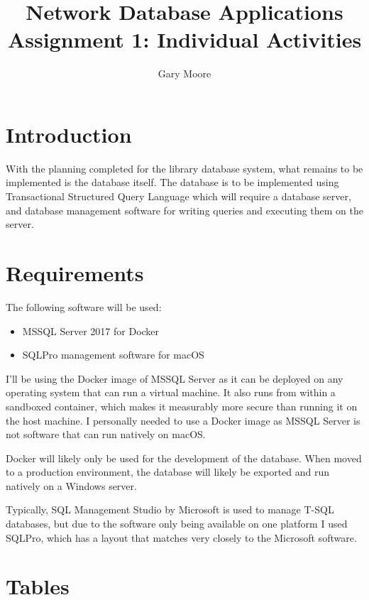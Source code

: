 \documentclass[11pt,a4paper]{scrartcl}
\author{Gary Moore}
\title{Network Database Applications Assignment 1: Individual Activities}
\begin{document}
	\maketitle
	
	\section{Introduction}\label{introduction}
	
	With the planning completed for the library database system, what remains to be implemented is the database itself. The database is to be implemented using Transactional Structured Query Language which will require a database server, and database management software for writing queries and executing them on the server.
	
	\section{Requirements}\label{requirements}
	
	The following software will be used:
	
	\begin{itemize}
		\item MSSQL Server 2017 for Docker
		\item SQLPro management software for macOS
	\end{itemize}
	
	I’ll be using the Docker image of MSSQL Server as it can be deployed on any operating system that can run a virtual machine. It also runs from within a sandboxed container, which makes it measurably more secure than running it on the host machine. I personally needed to use a Docker image as MSSQL Server is not software that can run natively on macOS.
	
	Docker will likely only be used for the development of the database. When moved to a production environment, the database will likely be exported and run natively on a Windows server.
	
	Typically, SQL Management Studio by Microsoft is used to manage T-SQL databases, but due to the software only being available on one platform I used SQLPro, which has a layout that matches very closely to the Microsoft software.
	
	\section{Tables}\label{sql requirements}
	
\end{document}
